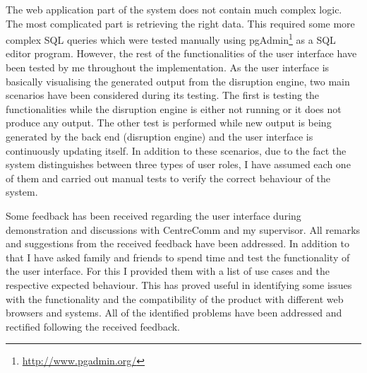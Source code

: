 The web application part of the system does not contain much complex logic. The most complicated part is retrieving the right data. This required some more complex SQL queries which were tested manually using pgAdmin\footnote{\url{http://www.pgadmin.org/}} as a SQL editor program. However, the rest of the functionalities of the user interface have been tested by me throughout the implementation. As the user interface is basically visualising the generated output from the disruption engine, two main scenarios have been considered during its testing. The first is testing the functionalities while the disruption engine is either not running or it does not produce any output. The other test is performed while new output is being generated by the back end (disruption engine) and the user interface is continuously updating itself. In addition to these scenarios, due to the fact the system distinguishes between three types of user roles, I have assumed each one of them and carried out manual tests to verify the correct behaviour of the system. 

Some feedback has been received regarding the user interface during demonstration and discussions with CentreComm and my supervisor. All remarks and suggestions from the received feedback have been addressed. In addition to that I have asked family and friends to spend time and test the functionality of the user interface. For this I provided them with a list of use cases and the respective expected behaviour. This has proved useful in identifying some issues with the functionality and the compatibility of the product with different web browsers and systems. All of the identified problems have been addressed and rectified following the received feedback.




